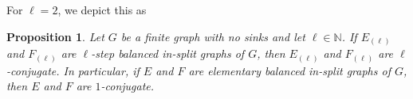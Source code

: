 \documentclass[12pt,a4paper,oneside,reqno,final]{amsart}
\newcommand{\N}{\mathbb{N}}
\newtheorem{proposition}[lemma]{Proposition}
\theoremstyle{definition}
\numberwithin{equation}{section} %
\begin{document}
For $\ell = 2$, we depict this as
\begin{figure}[H]
    \begin{center}
    \end{center}
\end{figure}

\begin{proposition}\label{prop:I+,eventual-conjugacy}
    Let $G$ be a finite graph with no sinks and let $\ell\in \N$.
    If $E_{(\ell)}$ and $F_{(\ell)}$ are $\ell$-step balanced in-split graphs of $G$, then $E_{(\ell)}$ and $F_{(\ell)}$ are $\ell$-conjugate.
    In particular, if $E$ and $F$ are elementary balanced in-split graphs of $G$, then $E$ and $F$ are $1$-conjugate.
\end{proposition}
\end{document}
